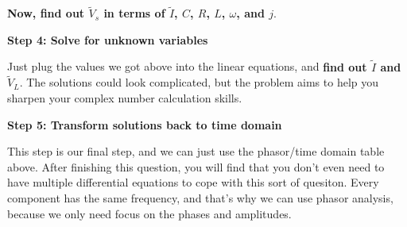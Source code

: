 \begin{enumerate}
\textbf{Now, find out $\widetilde{V}_s$ in terms of $\widetilde{I}$, $C$, $R$, $L$, $\omega$, and $j$}.

\ws{\vspace{120px}}


\qitem \textbf{Step 4: Solve for unknown variables}

Just plug the values we got above into the linear equations, and \textbf{find out $\widetilde{I}$ and $\widetilde{V}_L$}. The solutions could look
complicated, but the problem aims to help you sharpen your complex number calculation skills.

\ws{\vspace{150px}}


\qitem \textbf{Step 5: Transform solutions back to time domain}

This step is our final step, and we can just use the phasor/time domain table above. After finishing this question, you will find that
you don't even need to have multiple differential equations to cope with this sort of quesiton. Every component has the same frequency, and that's 
why we can use phasor analysis, because we only need focus on the phases and amplitudes. 


\end{enumerate}
